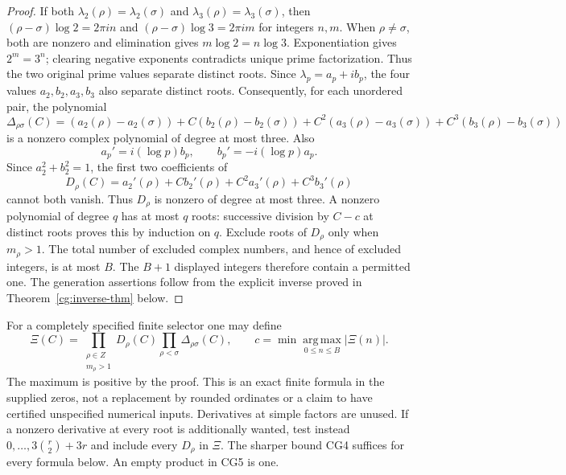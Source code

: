 \begin{proof}
If both $\lambda_2(\rho)=\lambda_2(\sigma)$ and
$\lambda_3(\rho)=\lambda_3(\sigma)$, then
$(\rho-\sigma)\log2=2\pi i n$ and
$(\rho-\sigma)\log3=2\pi i m$ for integers $n,m$.
When $\rho\ne\sigma$, both are nonzero and elimination gives
$m\log2=n\log3$. Exponentiation gives $2^m=3^n$;
clearing negative exponents contradicts unique prime factorization.
Thus the two original prime values separate distinct roots.
Since $\lambda_p=a_p+ib_p$, the four values
$a_2,b_2,a_3,b_3$ also separate distinct roots.
Consequently, for each unordered pair, the polynomial
\[
 \Delta_{\rho\sigma}(C)=
 (a_2(\rho)-a_2(\sigma))
 +C(b_2(\rho)-b_2(\sigma))
 +C^2(a_3(\rho)-a_3(\sigma))
 +C^3(b_3(\rho)-b_3(\sigma))
\]
is a nonzero complex polynomial of degree at most three.
Also
\[
 a_p'=i(\log p)b_p,\qquad b_p'=-i(\log p)a_p.
\]
Since $a_2^2+b_2^2=1$, the first two coefficients of
\[
 D_\rho(C)=a_2'(\rho)+C b_2'(\rho)
                  +C^2a_3'(\rho)+C^3b_3'(\rho)
\]
cannot both vanish. Thus $D_\rho$ is nonzero of degree at most
three. A nonzero polynomial of degree $q$ has at most $q$ roots:
successive division by $C-c$ at distinct roots proves this by
induction on $q$. Exclude roots of $D_\rho$ only when $m_\rho>1$.
The total number of excluded complex numbers,
and hence of excluded integers, is at most $B$.
The $B+1$ displayed integers therefore contain a permitted one.
The generation assertions follow from the explicit inverse proved
in Theorem~\ref{cg:inverse-thm} below.
\end{proof}

For a completely specified finite selector one may define
\begin{equation}
 \Xi(C)=\prod_{\substack{\rho\in Z\\m_\rho>1}}D_\rho(C)
                 \prod_{\rho<\sigma}\Delta_{\rho\sigma}(C),\qquad
 c=\min\operatorname*{arg\,max}_{0\le n\le B}|\Xi(n)|.
 \tag{CG5}\label{cg:selector}
\end{equation}
The maximum is positive by the proof. This is an exact finite
formula in the supplied zeros, not a replacement by rounded
ordinates or a claim to have certified unspecified numerical inputs.
Derivatives at simple factors are unused. If a nonzero derivative
at every root is additionally wanted, test instead
$0,\ldots,3\binom r2+3r$ and include every $D_\rho$ in $\Xi$.
The sharper bound CG4 suffices for every formula below. An empty
product in CG5 is one.

